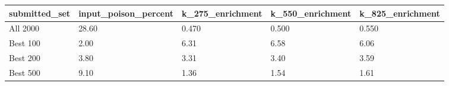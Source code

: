 \begin{tabular}{lllll}
\toprule
submitted\_set & input\_poison\_percent & k\_275\_enrichment & k\_550\_enrichment & k\_825\_enrichment \\
\midrule
All 2000 & 28.60 & 0.470 & 0.500 & 0.550 \\
Best 100 & 2.00 & 6.31 & 6.58 & 6.06 \\
Best 200 & 3.80 & 3.31 & 3.40 & 3.59 \\
Best 500 & 9.10 & 1.36 & 1.54 & 1.61 \\
\bottomrule
\end{tabular}
